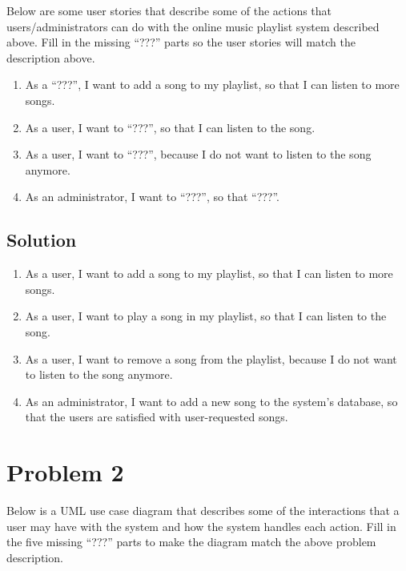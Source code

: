 \documentclass{article}
\begin{document}
    Below are some user stories that describe some of the actions that
    users/administrators can do with the online music playlist system described
    above. Fill in the missing “???” parts so the user stories will match the
    description above.

    \begin{enumerate}[label=\quad\quad, leftmargin=*]
        \item
        As a “???”, I want to add a song to my playlist, so that I can listen to more songs.
        \item
        As a user, I want to “???”, so that I can listen to the song.
        \item
        As a user, I want to “???”, because I do not want to listen to the song anymore.
        \item
        As an administrator, I want to “???”, so that “???”.
    \end{enumerate}

    \subsection*{Solution}

    \begin{enumerate}[label=\quad\quad, leftmargin=*]
        \item
        As a user, I want to add a song to my playlist, so that I can listen to more songs.
        \item
        As a user, I want to play a song in my playlist, so that I can listen to the song.
        \item
        As a user, I want to remove a song from the playlist, because I do not want to listen to the song anymore.
        \item
        As an administrator, I want to add a new song to the system's database, 
        so that the users are satisfied with user-requested songs.
    \end{enumerate}



    \section*{Problem 2}

    Below is a UML use case diagram that describes some of the interactions that a
    user may have with the system and how the system handles each action. Fill in
    the five missing “???” parts to make the diagram match the above problem
    description.
\end{document}
